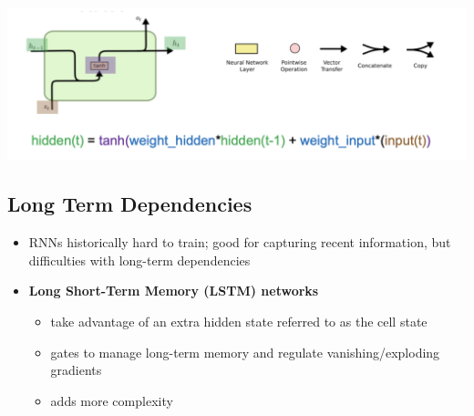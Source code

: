 \documentclass[11pt]{article}
\begin{document}
\begin{center}
\includegraphics[scale=0.5]{images/rnn.png}
\end{center}

\subsection{Long Term Dependencies}
\begin{itemize}
\item RNNs historically hard to train; good for capturing recent information, but difficulties with long-term dependencies
\item \textbf{Long Short-Term Memory (LSTM) networks}
\begin{itemize}
\item take advantage of an extra hidden state referred to as the cell state
\item gates to manage long-term memory and regulate vanishing/exploding gradients
\item adds more complexity
\end{itemize}
\end{itemize}
\end{document}
